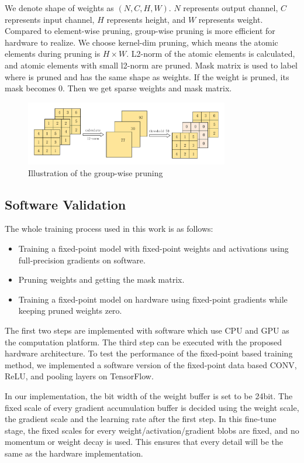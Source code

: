 We denote shape of weights as $(N, C, H, W)$. $N$ represents output channel, $C$ represents input channel, $H$ represents height, and $W$ represents weight. Compared to element-wise pruning, group-wise pruning is more efficient for hardware to realize. We choose kernel-dim pruning, which means the atomic elements during pruning is $H \times W$. L2-norm of the atomic elements is calculated, and atomic elements with small l2-norm are pruned. Mask matrix is used to label where is pruned and has the same shape as weights. If the weight is pruned, its mask becomes 0. Then we get sparse weights and mask matrix. 

\begin{figure}[tb]
    \centering\includegraphics[width=3.5in]{figures/prune-light.pdf}
    \caption{Illustration of the group-wise pruning}\label{fig:prune}
\end{figure}



\subsection{Software Validation}

The whole training process used in this work is as follows:
\begin{itemize}
\item Training a fixed-point model with fixed-point weights and activations using full-precision gradients on software.
\item Pruning weights and getting the mask matrix.
\item Training a fixed-point model on hardware using fixed-point gradients while keeping pruned weights zero.
\end{itemize}

The first two steps are implemented with software which use CPU and GPU as the computation platform. The third step can be executed with the proposed hardware architecture. To test the performance of the fixed-point based training method, we implemented a software version of the fixed-point data based CONV, ReLU, and pooling layers on TensorFlow.

In our implementation, the bit width of the weight buffer is set to be 24bit. The fixed scale of every gradient accumulation buffer is decided using the weight scale, the gradient scale and the learning rate after the first step. In this fine-tune stage, the fixed scales for every weight/activation/gradient blobs are fixed, and no momentum or weight decay is used. This ensures that every detail will be the same as the hardware implementation.

